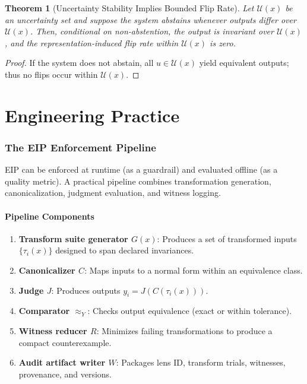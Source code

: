 \documentclass[12pt,letterpaper]{article}
\newtheorem{theorem}{Theorem}[section]
\theoremstyle{definition}
\theoremstyle{plain}
\newcommand{\calU}{\mathcal{U}}
\newcommand{\equivY}{\approx_Y}
\begin{document}
\begin{theorem}[Uncertainty Stability Implies Bounded Flip Rate]
\label{thm:uncertainty}
Let $\calU(x)$ be an uncertainty set and suppose the system abstains whenever outputs differ over $\calU(x)$. Then, conditional on non-abstention, the output is invariant over $\calU(x)$, and the representation-induced flip rate within $\calU(x)$ is zero.
\end{theorem}

\begin{proof}
If the system does not abstain, all $u \in \calU(x)$ yield equivalent outputs; thus no flips occur within $\calU(x)$.
\end{proof}


\part{Engineering Practice}
\label{part:practice}

\section{The EIP Enforcement Pipeline}
\label{sec:pipeline}

EIP can be enforced at runtime (as a guardrail) and evaluated offline (as a quality metric). A practical pipeline combines transformation generation, canonicalization, judgment evaluation, and witness logging.

\subsection{Pipeline Components}

\begin{enumerate}
    \item \textbf{Transform suite generator $G(x)$}: Produces a set of transformed inputs $\{\tau_i(x)\}$ designed to span declared invariances.
    \item \textbf{Canonicalizer $C$}: Maps inputs to a normal form within an equivalence class.
    \item \textbf{Judge $J$}: Produces outputs $y_i = J(C(\tau_i(x)))$.
    \item \textbf{Comparator $\equivY$}: Checks output equivalence (exact or within tolerance).
    \item \textbf{Witness reducer $R$}: Minimizes failing transformations to produce a compact counterexample.
    \item \textbf{Audit artifact writer $W$}: Packages lens ID, transform trials, witnesses, provenance, and versions.
\end{enumerate}
\end{document}
